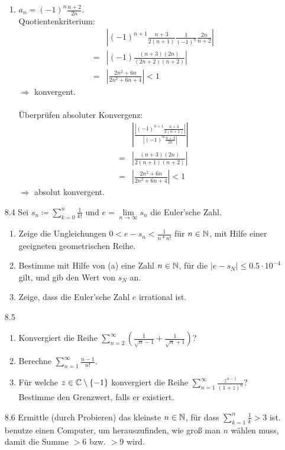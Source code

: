 \documentclass{HM}
\begin{document}
\begin{enumerate}
\begin{enumerate}
\item $a_n=(-1)^n\frac{n+2}{2n}$.\\
Quotientenkriterium:\\
\begin{align*}
	&\left|(-1)^{n+1}\frac{n+3}{2(n+1)}\frac{1}{(-1)^n}\frac{2n}{n+2}\right|\\
	=&\left|(-1)\frac{(n+3)(2n)}{(2n+2)(n+2)}\right|\\
	=&\left|\frac{2n^2+6n}{2n^2+6n+4}\right|<1
\end{align*}
$\Rightarrow$ konvergent.\\\\
Überprüfen absoluter Konvergenz:\\
\begin{align*}
	&\left|\frac{\left|(-1)^{n+1}\frac{n+3}{2(n+1)}\right|}{\left|(-1)^n\frac{n+2}{2n}\right|}\right|\\
	=&\left|\frac{(n+3)(2n)}{2(n+1)(n+2)}\right|\\
	=&\left|\frac{2n^2+6n}{2n^2+6n+4}\right|<1
\end{align*}
$\Rightarrow$ absolut konvergent.
\end{enumerate}
\item[8.4] Sei $s_n\coloneqq \sum\limits_{k=0}^n\frac{1}{k!}$ und $e=\lim\limits_{n\to\infty}s_n$ die Euler'sche Zahl.
\begin{enumerate}
\item Zeige die Ungleichungen $0<e-s_n<\frac{1}{n*n!}$ für $n\in\mathbb{N}$, mit Hilfe einer geeigneten geometrischen Reihe.
\item Bestimme mit Hilfe von (a) eine Zahl $n\in\mathbb{N}$, für die $|e-s_N|\leq 0.5\cdot 10^{-4}$ gilt, und gib den Wert von $s_N$ an.
\item Zeige, dass die Euler'sche Zahl $e$ irrational ist.
\end{enumerate}
\item[8.5]
\begin{enumerate}
\item Konvergiert die Reihe $\sum\limits_{n=2}^\infty\left(\frac{1}{\sqrt{n}-1}+\frac{1}{\sqrt{n}+1}\right)$?
\item Berechne $\sum\limits_{n=1}^\infty\frac{n-1}{n!}$.
\item Für welche $z\in\mathbb{C}\setminus\lbrace-1\rbrace$ konvergiert die Reihe $\sum\limits_{n=1}^\infty\frac{z^{n-1}}{(1+z)^n}?$\\
Bestimme den Grenzwert, falls er existiert.
\end{enumerate}
\item[8.6] Ermittle (durch Probieren) das kleinste $n\in\mathbb{N}$, für dass $\sum\limits_{k=1}^n\frac{1}{k}>3$ ist. benutze einen Computer, um herauszufinden, wie groß man $n$ wählen muss, damit die Summe $>6$ bzw. $>9$ wird.
\end{enumerate}
\end{document}
